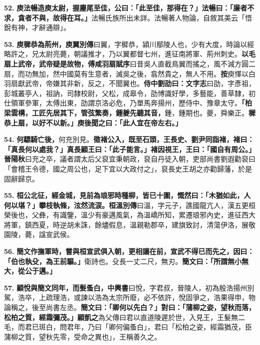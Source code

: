 \textbf{52.} \textbf{庾法暢造庾太尉，握麈尾至佳，公曰：「此至佳，那得在？」法暢曰：「廉者不求，貪者不與，故得在耳。」}{\footnotesize 法暢氏族所出未詳。法暢著人物論，自敘其美云「悟銳有神，才辭通辯」。}

\textbf{53.} \textbf{庾穉恭為荊州，}{\footnotesize \textbf{庾翼別傳}曰翼，字穉恭，潁川鄢陵人也，少有大度，時論以經略許之，兄太尉亮薨，朝議推才，乃以翼都督七州，進征南將軍、荊州刺史。}\textbf{以毛扇上武帝，武帝疑是故物，}{\footnotesize \textbf{傅咸羽扇賦序}曰昔吳人直截鳥翼而搖之，風不減方圓二扇，而功無加，然中國莫有生意者，滅吳之後，翕然貴之，無人不用。\textbf{按}庾懌以白羽扇獻武帝，帝嫌其非新，反之，不聞翼也。}\textbf{侍中劉劭曰：}{\footnotesize \textbf{文字志}曰劭，字彥祖，彭城叢亭人，祖訥，司隸校尉，父松，成皋令，劭博識好學，多藝能，善草隸，初仕領軍參軍，太傅出東，劭謂京洛必危，乃單馬奔揚州，歷侍中、豫章太守。}\textbf{「柏梁雲構，工匠先居其下，管弦繁奏，鍾夔先聽其音，}{\footnotesize 鍾，鍾期也。夔，舜樂正。}\textbf{穉恭上扇，以好不以新。」庾後聞之曰：「此人宜在帝左右。」}

\textbf{54.} \textbf{何驃騎亡後，}{\footnotesize 何充別見。}\textbf{徵褚公入，既至石頭，王長史、劉尹同詣褚，褚曰：「真長何以處我？」真長顧王曰：「此子能言。」褚因視王，王曰：「國自有周公。」}{\footnotesize \textbf{晉陽秋}曰充之卒，議者謂太后父裒宜秉朝政，裒自丹徒入朝，吏部尚書劉遐勸裒曰「會稽王令德，國之周公也，足下宜以大政付之」，裒長史王胡之亦勸歸藩，於是固辭歸京。}

\textbf{55.} \textbf{桓公北征，經金城，見前為琅邪時種柳，皆已十圍，慨然曰：「木猶如此，人何以堪？」攀枝執條，泫然流涙。}{\footnotesize \textbf{桓溫別傳}曰溫，字元子，譙國龍亢人，漢五更桓榮後也，父彝，有識鑒，溫少有豪邁風氣，為溫嶠所知，累遷琅邪內史，進征西大將軍，鎮西夏，時逆胡未誅，餘燼假息，溫親勒郡卒，建旗致討，清蕩伊洛，展敬園陵，薨，諡宣武侯。}

\textbf{56.} \textbf{簡文作撫軍時，嘗與桓宣武俱入朝，更相讓在前，宣武不得已而先之，因曰：「伯也執殳，為王前驅。」}{\footnotesize 衛詩也。殳長一丈二尺，無刃。}\textbf{簡文曰：「所謂無小無大，從公于邁。」}

\textbf{57.} \textbf{顧悅與簡文同年，而髮蚤白，}{\footnotesize \textbf{中興書}曰悅，字君叔，晉陵人，初為殷浩揚州別駕，浩卒，上疏理浩，或諫以浩為太宗所廢，必不依許，悅固爭之，浩果得申，物論稱之，後至尚書左丞。}\textbf{簡文曰：「卿何以先白？」對曰：「蒲柳之姿，望秋而落，松柏之質，經霜彌茂。」}{\footnotesize \textbf{顧凱之}為父傳曰君以直道陵遲於世，入見王，王髮無二毛，而君已斑白，問君年，乃曰「卿何偏蚤白」，君曰「松柏之姿，經霜猶茂，臣蒲柳之質，望秋先零，受命之異也」，王稱善久之。}

